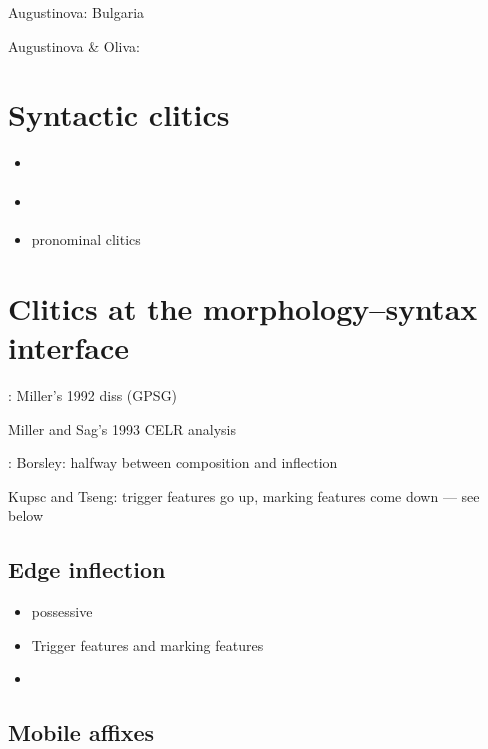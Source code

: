 \documentclass[output=paper 	        ,biblatex                ,babelshorthands                ,newtxmath                ,draftmode                ,colorlinks, citecolor=brown]{langscibook}
\begin{document}
Augustinova: Bulgaria \citet{avgustinova_t97}

Augustinova \& Oliva: 

\section{Syntactic clitics}

\begin{itemize}
\item {} \citep{Penn:99}

\item {} \citep{avgustinova_t-oliva_k95}
\item {} pronominal clitics \citep{kupsc_a00,kupsc_a99}

\end{itemize}

\section{Clitics at the morphology--syntax interface}

: Miller's 1992 diss (GPSG)

Miller and Sag's 1993 CELR analysis 

:
Borsley: halfway between composition and inflection

Kupsc and Tseng: trigger features go up, marking features come down
--- see below

\subsection{Edge inflection}

\begin{itemize}
\item {} possessive \citep{zwicky_a87}

\item Trigger features and marking features
  \citep{miller_p-halpern_a93}

\item {} \citep{Tseng02,Bonami14c}
\end{itemize}

\subsection{Mobile affixes}
\end{document}

